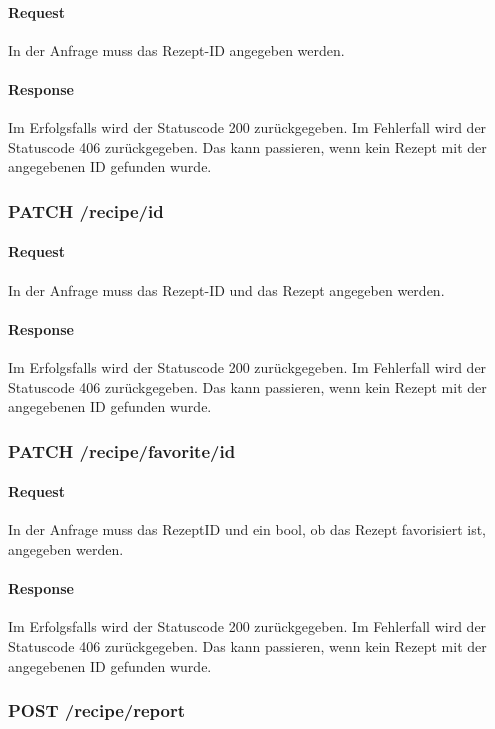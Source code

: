 \documentclass{entwurfsheft}
\begin{document}
\begin{sloppypar}
    \paragraph{Request}
        In der Anfrage muss das Rezept-ID angegeben werden.
    \paragraph{Response}
        Im Erfolgsfalls wird der Statuscode 200 zurückgegeben.
        Im Fehlerfall wird der Statuscode 406 zurückgegeben. Das kann passieren, wenn kein Rezept mit der angegebenen ID gefunden wurde.

\subsubsection*{PATCH /recipe/id}
    \paragraph{Request}
        In der Anfrage muss das Rezept-ID und das Rezept angegeben werden.
    \paragraph{Response}
        Im Erfolgsfalls wird der Statuscode 200 zurückgegeben.
        Im Fehlerfall wird der Statuscode 406 zurückgegeben. Das kann passieren, wenn kein Rezept mit der angegebenen ID gefunden wurde.

\subsubsection*{PATCH /recipe/favorite/id}
    \paragraph{Request}
        In der Anfrage muss das RezeptID und ein \gls{bool}, ob das Rezept favorisiert ist, angegeben werden.
    \paragraph{Response}
        Im Erfolgsfalls wird der Statuscode 200 zurückgegeben.
        Im Fehlerfall wird der Statuscode 406 zurückgegeben. Das kann passieren, wenn kein Rezept mit der angegebenen ID gefunden wurde.
        
\subsubsection*{POST /recipe/report}

\end{sloppypar}
\end{document}
